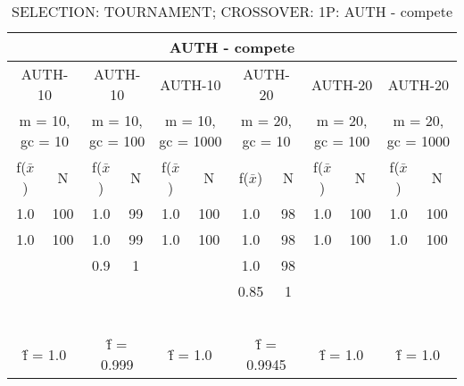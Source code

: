 \begin{table}[H]
	\centering
	\caption{SELECTION: TOURNAMENT; CROSSOVER: 1P: AUTH - compete}
	\begin{adjustbox}{width=1\textwidth}
		\begin{tabular}{ |c|c||c|c||c|c||c|c||c|c||c|c| }
			\hline
			\multicolumn{12}{|c|}{AUTH - compete} \\
			\hline
			\multicolumn{2}{|c||}{AUTH-10} & \multicolumn{2}{c||}{AUTH-10} & \multicolumn{2}{c||}{AUTH-10} & \multicolumn{2}{c||}{AUTH-20} & \multicolumn{2}{c||}{AUTH-20} & \multicolumn{2}{c|}{AUTH-20}\\
			\hline
			\multicolumn{2}{|c||}{m = 10, gc = 10} & \multicolumn{2}{c||}{m = 10, gc = 100} & \multicolumn{2}{c||}{m = 10, gc = 1000} & \multicolumn{2}{c||}{m = 20, gc = 10} & \multicolumn{2}{c||}{m = 20, gc = 100} & \multicolumn{2}{c|}{m = 20, gc = 1000}\\
			\hline
			f($\bar{x}$) & N & f($\bar{x}$) & N & f($\bar{x}$) & N & f($\bar{x}$) & N & f($\bar{x}$) & N & f($\bar{x}$) & N\\
			\hline
			\hline
			1.0 & 100 & 1.0 & 99 & 1.0 & 100 & 1.0 & 98 & 1.0 & 100 & 1.0 & 100\\
			\hline
			1.0 & 100 & 1.0 & 99 & 1.0 & 100 & 1.0 & 98 & 1.0 & 100 & 1.0 & 100\\
			&   & 0.9 & 1 &   &   & 1.0 & 98 &   &   &   &  \\
			&   &   &   &   &   & 0.85 & 1 &   &   &   &  \\
			&   &   &   &   &   &   &   &   &   &   &  \\
			&   &   &   &   &   &   &   &   &   &   &  \\
			&   &   &   &   &   &   &   &   &   &   &  \\
			&   &   &   &   &   &   &   &   &   &   &  \\
			&   &   &   &   &   &   &   &   &   &   &  \\
			\hline
			\multicolumn{2}{|c||}{\^{f} = 1.0} & \multicolumn{2}{c||}{\^{f} = 0.999} & \multicolumn{2}{c||}{\^{f} = 1.0} & \multicolumn{2}{c||}{\^{f} = 0.9945} & \multicolumn{2}{c||}{\^{f} = 1.0} & \multicolumn{2}{c|}{\^{f} = 1.0}\\
			\hline
		\end{tabular}
	\end{adjustbox}
\end{table}

